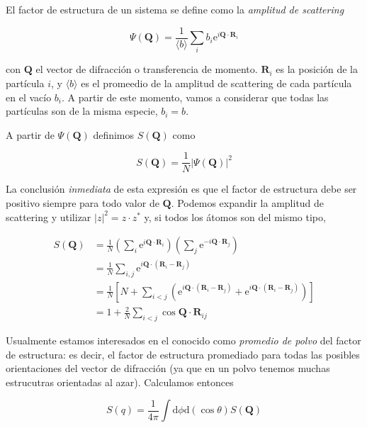 El factor de estructura de un sistema se define como la \emph{amplitud de scattering}~\cite{egami_underneath_2003}

\begin{equation}
  \Psi(\mathbf{Q}) = \frac{1}{\langle b\rangle} \sum_i b_i
  \text{e}^{i\mathbf{Q}\cdot\mathbf{R}_i}
  \label{eq:scat_amp}
\end{equation}

con $\mathbf{Q}$ el vector de difracción o transferencia de momento.
$\mathbf{R}_i$ es la posición de la partícula $i$, y $\langle b\rangle$ es el promeedio de la amplitud de scattering de cada partícula en el vacío $b_i$.
A partir de este momento, vamos a considerar que todas las partículas son de la misma especie, $b_i = b$.

A partir de $\Psi(\mathbf{Q})$ definimos $S(\mathbf{Q})$ como

\begin{equation*}
  S(\mathbf{Q}) = \frac{1}{N} |\Psi(\mathbf{Q})|^2
\end{equation*}

La conclusión \emph{inmediata} de esta expresión es que el factor de estructura debe ser positivo siempre para todo valor de $\mathbf{Q}$.
Podemos expandir la amplitud de scattering y utilizar $|z|^2 = z\cdot z^*$  y, si todos los átomos son del mismo tipo,


\begin{align*}
  S(\mathbf{Q}) &= \frac{1}{N} \left( \sum_i \text{e}^{i\mathbf{Q}\cdot\mathbf{R}_i} \right)
  \left( \sum_j \text{e}^{-i\mathbf{Q}\cdot\mathbf{R}_j} \right)\\
  &= \frac{1}{N} \sum_{i, j} \text{e}^{i\mathbf{Q}\cdot(\mathbf{R}_i-\mathbf{R}_j)}\\
  &= \frac{1}{N} \left[N + \sum_{i < j}
    \left(\text{e}^{i\mathbf{Q}\cdot(\mathbf{R}_i-\mathbf{R}_j)} +
      \text{e}^{i\mathbf{Q}\cdot(\mathbf{R}_i-\mathbf{R}_j)}\right)\right]\\
  &= 1 + \frac{2}{N}\sum_{i < j}\cos{\mathbf{Q}\cdot\mathbf{R}_{ij}}
\end{align*}

Usualmente estamos interesados en el conocido como \emph{promedio de polvo} del factor de estructura: es decir, el factor de estructura promediado para todas las posibles orientaciones del vector de difracción (ya que en un polvo tenemos muchas estrucutras orientadas al azar).
Calculamos entonces

\begin{equation*}
  S(q) = \frac{1}{4\pi}\int\text{d}\phi\text{d}(\cos\theta) S(\mathbf{Q})
\end{equation*}


